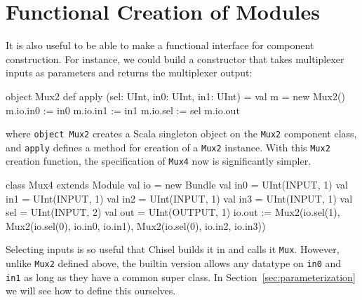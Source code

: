 \documentclass[twocolumn,10pt]{article}
\def\code#1{{\tt #1}}
\begin{document}
%
%
%
%
%

\section{Functional Creation of Modules}
\label{sec:funconstructor}

It is also useful to be able to make a functional interface for
component construction.  For instance, we could build a constructor
that takes multiplexer inputs as parameters and returns the
multiplexer output:

\begin{scala}
object Mux2 {
  def apply (sel: UInt, in0: UInt, in1: UInt) = {
    val m = new Mux2()
    m.io.in0 := in0
    m.io.in1 := in1
    m.io.sel := sel
    m.io.out
  }
}
\end{scala}

\noindent
where \code{object Mux2} creates a Scala singleton object on the \code{Mux2}
component class, and \code{apply} defines a method for creation of a \code{Mux2} instance.
%
With this \code{Mux2} creation function, the specification of \code{Mux4} now is
significantly simpler.

\begin{scala}
class Mux4 extends Module {
  val io = new Bundle {
    val in0 = UInt(INPUT, 1)
    val in1 = UInt(INPUT, 1)
    val in2 = UInt(INPUT, 1)
    val in3 = UInt(INPUT, 1)
    val sel = UInt(INPUT, 2)
    val out = UInt(OUTPUT, 1)
  }
  io.out := Mux2(io.sel(1),
                 Mux2(io.sel(0), io.in0, io.in1),
                 Mux2(io.sel(0), io.in2, io.in3))
}
\end{scala}

Selecting inputs is so useful that Chisel builds it in and calls it
\code{Mux}.  However, unlike \code{Mux2} defined above, the builtin version allows any datatype on
\code{in0} and \code{in1} as long as they have a common super class.
In Section~\ref{sec:parameterization} we will see how to define this
ourselves.
\end{document}

